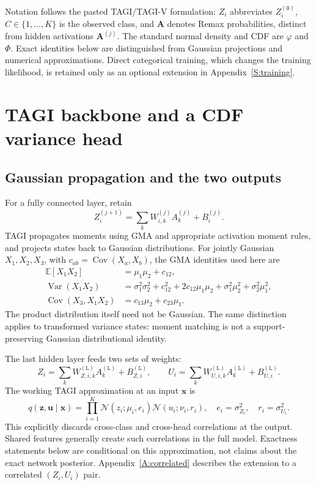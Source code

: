 \documentclass[letterpaper]{article}
\newcommand{\E}{\mathbb E}
\newcommand{\Var}{\operatorname{Var}}
\newcommand{\Cov}{\operatorname{Cov}}
\newcommand{\Normal}{\mathcal N}
\newcommand{\given}{\mid}
\begin{document}
Notation follows the pasted TAGI/TAGI-V formulation: $Z_i$ abbreviates $Z_i^{(\mathtt O)}$, $C\in\{1,\ldots,K\}$ is the observed class, and $\bm A$ denotes Remax probabilities, distinct from hidden activations $\bm A^{(j)}$. The standard normal density and CDF are $\varphi$ and $\Phi$. Exact identities below are distinguished from Gaussian projections and numerical approximations. Direct categorical training, which changes the training likelihood, is retained only as an optional extension in Appendix~\ref{S:training}.

\section{TAGI backbone and a CDF variance head}\label{S:cdf}
\subsection{Gaussian propagation and the two outputs}
For a fully connected layer, retain
\begin{equation}
Z_i^{(j+1)}=\sum_k W_{i,k}^{(j)}A_k^{(j)}+B_i^{(j)}.
\end{equation}
TAGI propagates moments using GMA and appropriate activation moment rules, and projects states back to Gaussian distributions. For jointly Gaussian $X_1,X_2,X_3$, with $c_{ab}=\Cov(X_a,X_b)$, the GMA identities used here are
\begin{align}
\E[X_1X_2]&=\mu_1\mu_2+c_{12},\\
\Var(X_1X_2)&=\sigma_1^2\sigma_2^2+c_{12}^2+2c_{12}\mu_1\mu_2+\sigma_1^2\mu_2^2+\sigma_2^2\mu_1^2,\\
\Cov(X_3,X_1X_2)&=c_{13}\mu_2+c_{23}\mu_1.
\end{align}
The product distribution itself need not be Gaussian. The same distinction applies to transformed variance states: moment matching is not a support-preserving Gaussian distributional identity.

The last hidden layer feeds two sets of weights:
\begin{equation}
Z_i=\sum_k W^{(\mathtt L)}_{Z,i,k}A_k^{(\mathtt L)}+B^{(\mathtt L)}_{Z,i},\qquad
U_i=\sum_k W^{(\mathtt L)}_{U,i,k}A_k^{(\mathtt L)}+B^{(\mathtt L)}_{U,i}.
\end{equation}
The working TAGI approximation at an input $\bm x$ is
\begin{equation}
q(\bm z,\bm u\given\bm x)=\prod_{i=1}^K
\Normal(z_i;\mu_i,e_i)\Normal(u_i;\nu_i,r_i),
\quad e_i=\sigma_{Z_i}^2,\quad r_i=\sigma_{U_i}^2.
\label{E:factorization}
\end{equation}
This explicitly discards cross-class and cross-head correlations at the output. Shared features generally create such correlations in the full model. Exactness statements below are conditional on this approximation, not claims about the exact network posterior. Appendix~\ref{A:correlated} describes the extension to a correlated $(Z_i,U_i)$ pair.
\end{document}
